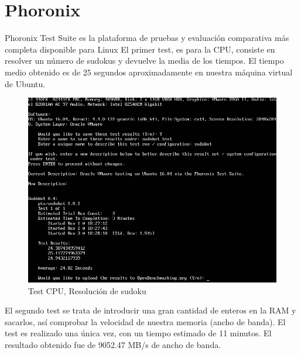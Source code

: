 \documentclass[12pt,a4paper]{article}
\begin{document}
	\section{Phoronix}
	Phoronix Test Suite es la plataforma de pruebas y evaluación comparativa más completa disponible para Linux
	\newline
	\newline
	El primer test, es para la CPU, consiste en resolver un número de sudokus y devuelve la media de los tiempos.
	\newline
	\newline
	El tiempo medio obtenido es de 25 segundos aproximadamente en nuestra máquina virtual de Ubuntu.
	\begin{figure}[h]
		\centering
		\includegraphics[width=1.0\textwidth]{images/sudokut-ubuntu-test.png}
		\caption{Test CPU, Resolución de sudoku}
	\end{figure}
	\newpage
	El segundo test se trata de introducir una gran cantidad de enteros en la RAM y sacarlos, así comprobar la velocidad de nuestra memoria (ancho de banda).
	\newline
	\newline
	El test es realizado una única vez, con un tiempo estimado de 11 minutos.
	\newline
	\newline
	El resultado obtenido fue de 9052.47 MB/s de ancho de banda.
\end{document}
